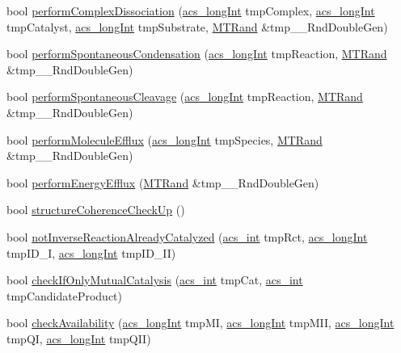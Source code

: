 \begin{DoxyCompactItemize}
\item 
bool \hyperlink{a00013_a5c5e57b0558067cbf55c894f33d0a121}{perform\+Complex\+Dissociation} (\hyperlink{a00050_a19319d75f02db4308bc5c0026d98cd85}{acs\+\_\+long\+Int} tmp\+Complex, \hyperlink{a00050_a19319d75f02db4308bc5c0026d98cd85}{acs\+\_\+long\+Int} tmp\+Catalyst, \hyperlink{a00050_a19319d75f02db4308bc5c0026d98cd85}{acs\+\_\+long\+Int} tmp\+Substrate, \hyperlink{a00015}{M\+T\+Rand} \&tmp\+\_\+\+\_\+\+Rnd\+Double\+Gen)
\item 
bool \hyperlink{a00013_acc764a05297ae00db52360f3df5ed1d5}{perform\+Spontaneous\+Condensation} (\hyperlink{a00050_a19319d75f02db4308bc5c0026d98cd85}{acs\+\_\+long\+Int} tmp\+Reaction, \hyperlink{a00015}{M\+T\+Rand} \&tmp\+\_\+\+\_\+\+Rnd\+Double\+Gen)
\item 
bool \hyperlink{a00013_a4949138a3771b7f6ec2bfe82cbad947e}{perform\+Spontaneous\+Cleavage} (\hyperlink{a00050_a19319d75f02db4308bc5c0026d98cd85}{acs\+\_\+long\+Int} tmp\+Reaction, \hyperlink{a00015}{M\+T\+Rand} \&tmp\+\_\+\+\_\+\+Rnd\+Double\+Gen)
\item 
bool \hyperlink{a00013_ad072a40a7d9521379c7ff50ed8110fbe}{perform\+Molecule\+Efflux} (\hyperlink{a00050_a19319d75f02db4308bc5c0026d98cd85}{acs\+\_\+long\+Int} tmp\+Species, \hyperlink{a00015}{M\+T\+Rand} \&tmp\+\_\+\+\_\+\+Rnd\+Double\+Gen)
\item 
bool \hyperlink{a00013_aff7607e0f3a74790109a7d87de3031bd}{perform\+Energy\+Efflux} (\hyperlink{a00015}{M\+T\+Rand} \&tmp\+\_\+\+\_\+\+Rnd\+Double\+Gen)
\item 
bool \hyperlink{a00013_a6606b08f25751a8796c13810962b385e}{structure\+Coherence\+Check\+Up} ()
\item 
bool \hyperlink{a00013_a5160dec152ed0369fe8af9aff3253a9e}{not\+Inverse\+Reaction\+Already\+Catalyzed} (\hyperlink{a00050_a8d277355641a098190360234e2ebde35}{acs\+\_\+int} tmp\+Rct, \hyperlink{a00050_a19319d75f02db4308bc5c0026d98cd85}{acs\+\_\+long\+Int} tmp\+I\+D\+\_\+\+I, \hyperlink{a00050_a19319d75f02db4308bc5c0026d98cd85}{acs\+\_\+long\+Int} tmp\+I\+D\+\_\+\+I\+I)
\item 
bool \hyperlink{a00013_abdafaeba15b5d32fd35569869c6244d5}{check\+If\+Only\+Mutual\+Catalysis} (\hyperlink{a00050_a8d277355641a098190360234e2ebde35}{acs\+\_\+int} tmp\+Cat, \hyperlink{a00050_a8d277355641a098190360234e2ebde35}{acs\+\_\+int} tmp\+Candidate\+Product)
\item 
bool \hyperlink{a00013_ad3ebcd7ab1c9ba1a0f65b264b97adf33}{check\+Availability} (\hyperlink{a00050_a19319d75f02db4308bc5c0026d98cd85}{acs\+\_\+long\+Int} tmp\+M\+I, \hyperlink{a00050_a19319d75f02db4308bc5c0026d98cd85}{acs\+\_\+long\+Int} tmp\+M\+I\+I, \hyperlink{a00050_a19319d75f02db4308bc5c0026d98cd85}{acs\+\_\+long\+Int} tmp\+Q\+I, \hyperlink{a00050_a19319d75f02db4308bc5c0026d98cd85}{acs\+\_\+long\+Int} tmp\+Q\+I\+I)

\end{DoxyCompactItemize}
